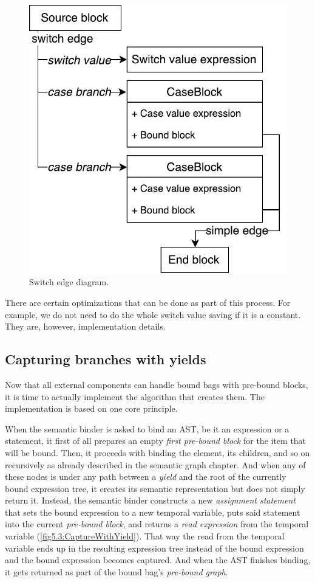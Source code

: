 \begin{figure}[H]
	\centering	
	\includegraphics[scale=0.75]{../img/5_3_switchEdge}	
	\caption{Switch edge diagram.}
	\label{fig5.3:SwitchEdge}
\end{figure}

There are certain optimizations that can be done as part of this process. For example, we do not need to do the whole switch value saving if it is a constant. They are, however, implementation details. 

\subsection{Capturing branches with yields}

Now that all external components can handle bound bags with pre-bound blocks, it is time to actually implement the algorithm that creates them. The implementation is based on one core principle. 

When the semantic binder is asked to bind an AST, be it an expression or a statement, it first of all prepares an empty \emph{first pre-bound block} for the item that will be bound. Then, it proceeds with binding the element, its children, and so on recursively as already described in the semantic graph chapter. And when any of these nodes is under any path between a \emph{yield} and the root of the currently bound expression tree, it creates its semantic representation but does not simply return it. Instead, the semantic binder constructs a new \emph{assignment statement} that sets the bound expression to a new temporal variable, puts said statement into the current \emph{pre-bound block}, and returns a \emph{read expression} from the temporal variable (\autoref{fig5.3:CaptureWithYield}). That way the read from the temporal variable ends up in the resulting expression tree instead of the bound expression and the bound expression becomes captured. And when the AST finishes binding, it gets returned as part of the bound bag’s \emph{pre-bound graph}.

